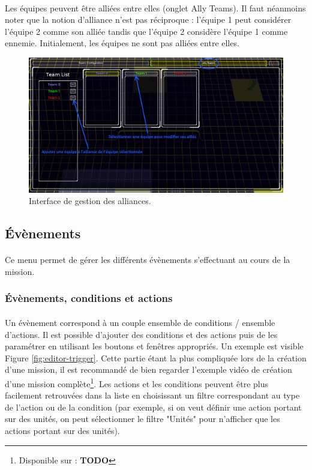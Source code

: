 \documentclass[a4paper]{article}
\begin{document}
\paragraph{ }
Les équipes peuvent être alliées entre elles (onglet Ally Teams). Il faut néanmoins noter que la notion d'alliance n'est pas réciproque : l'équipe 1 peut considérer l'équipe 2 comme son alliée tandis que l'équipe 2 considère l'équipe 1 comme ennemie. Initialement, les équipes ne sont pas alliées entre elles.
\begin{figure}[H]
\centering
\includegraphics[width=\linewidth]{editor-allyteam.png}
\caption{Interface de gestion des alliances.}
\label{fig:editor-allyteam}
\end{figure}
\subsection{Évènements}
\paragraph{ }
Ce menu permet de gérer les différents évènements s'effectuant au cours de la mission.
\subsubsection{Évènements, conditions et actions}
\paragraph{ }
Un évènement correspond à un couple ensemble de conditions / ensemble d'actions. Il est possible d'ajouter des conditions et des actions puis de les paramétrer en utilisant les boutons et fenêtres appropriés. Un exemple est visible Figure \ref{fig:editor-trigger}. Cette partie étant la plus compliquée lors de la création d'une mission, il est recommandé de bien regarder l'exemple vidéo de création d'une mission complète\footnote{Disponible sur : \textbf{TODO}}. Les actions et les conditions peuvent être plus facilement retrouvées dans la liste en choisissant un filtre correspondant au type de l'action ou de la condition (par exemple, si on veut définir une action portant sur des unités, on peut sélectionner le filtre "Unités" pour n'afficher que les actions portant sur des unités).
\end{document}
